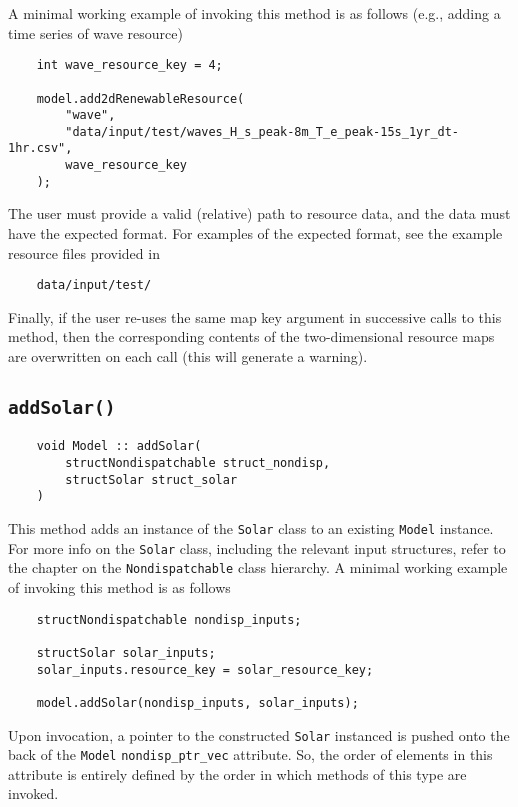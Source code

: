 \documentclass[12pt, letterpaper]{report}
\begin{document}
\noindent A minimal working example of invoking this method is as follows (e.g., adding a time series of wave resource)

\begin{verbatim}
    int wave_resource_key = 4;
    
    model.add2dRenewableResource(
        "wave",
        "data/input/test/waves_H_s_peak-8m_T_e_peak-15s_1yr_dt-1hr.csv",
        wave_resource_key
    );
\end{verbatim}

\noindent The user must provide a valid (relative) path to resource data, and the data must have the expected format. For examples of the expected format, see the example resource files provided in

\begin{verbatim}
    data/input/test/
\end{verbatim}

\noindent Finally, if the user re-uses the same map key argument in successive calls to this method, then the corresponding contents of the two-dimensional resource maps are overwritten on each call (this will generate a warning).

\subsection{\texttt{addSolar(\;\;)}}

\begin{verbatim}
    void Model :: addSolar(
        structNondispatchable struct_nondisp,
        structSolar struct_solar
    )
\end{verbatim}

This method adds an instance of the \texttt{Solar} class to an existing \texttt{Model} instance. For more info on the \texttt{Solar} class, including the relevant input structures, refer to the chapter on the \texttt{Nondispatchable} class hierarchy. A minimal working example of invoking this method is as follows

\begin{verbatim}
    structNondispatchable nondisp_inputs;
    
    structSolar solar_inputs;
    solar_inputs.resource_key = solar_resource_key;
    
    model.addSolar(nondisp_inputs, solar_inputs);
\end{verbatim}

\noindent Upon invocation, a pointer to the constructed \texttt{Solar} instanced is pushed onto the back of the \texttt{Model} \texttt{nondisp\_ptr\_vec} attribute. So, the order of elements in this attribute is entirely defined by the order in which methods of this type are invoked.
\end{document}

